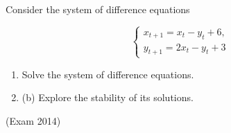 \begin{solution}
\end{solution}






\begin{problem}
Consider the system of difference equations

\[\left\{\begin{array}{c} {x_{t+1} =x_{t} -y_{t} +6,} \\ {y_{t+1} =2x_{t} -y_{t} +3} \end{array}\right. \] 

\begin{enumerate}
\item  Solve the system of difference equations.

\item  (b) Explore the stability of its solutions.
\end{enumerate}

(Exam 2014)
\end{problem}

